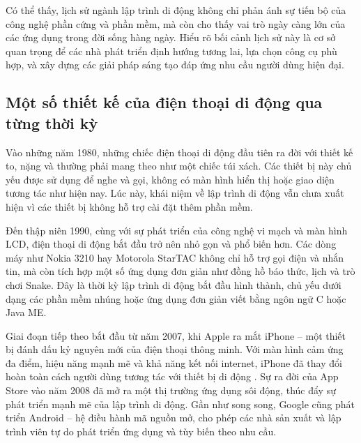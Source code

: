   \vspace{0.5em}

  \hspace*{0.8cm}Có thể thấy, lịch sử ngành lập trình di động không chỉ phản ánh sự tiến bộ của công nghệ phần cứng và phần mềm, mà còn cho thấy vai trò ngày càng lớn của các ứng dụng trong đời sống hàng ngày. Hiểu rõ bối cảnh lịch sử này là cơ sở quan trọng để các nhà phát triển định hướng tương lai, lựa chọn công cụ phù hợp, và xây dựng các giải pháp sáng tạo đáp ứng nhu cầu người dùng hiện đại.


\subsection{Một số thiết kế của điện thoại di động qua từng thời kỳ}
\renewcommand{\labelitemi}{--}    
    
        \hspace*{0.8cm}Vào những năm 1980, những chiếc điện thoại di động đầu tiên ra đời với thiết kế to, nặng và thường phải mang theo như một chiếc túi xách. Các thiết bị này chủ yếu được sử dụng để nghe và gọi, không có màn hình hiển thị hoặc giao diện tương tác như hiện nay. Lúc này, khái niệm về lập trình di động vẫn chưa xuất hiện vì các thiết bị không hỗ trợ cài đặt thêm phần mềm.
    
        \vspace{0.5em}
    
      \hspace*{0.8cm}Đến thập niên 1990, cùng với sự phát triển của công nghệ vi mạch và màn hình LCD, điện thoại di động bắt đầu trở nên nhỏ gọn và phổ biến hơn. Các dòng máy như Nokia 3210 hay Motorola StarTAC không chỉ hỗ trợ gọi điện và nhắn tin, mà còn tích hợp một số ứng dụng đơn giản như đồng hồ báo thức, lịch và trò chơi Snake. Đây là thời kỳ lập trình di động bắt đầu hình thành, chủ yếu dưới dạng các phần mềm nhúng hoặc ứng dụng đơn giản viết bằng ngôn ngữ C hoặc Java ME.
  
      \vspace{0.5em}
  
    \hspace*{0.8cm}Giai đoạn tiếp theo bắt đầu từ năm 2007, khi Apple ra mắt iPhone – một thiết bị đánh dấu kỷ nguyên mới của điện thoại thông minh. Với màn hình cảm ứng đa điểm, hiệu năng mạnh mẽ và khả năng kết nối internet, iPhone đã thay đổi hoàn toàn cách người dùng tương tác với thiết bị di động \cite{iphone2007}. Sự ra đời của App Store vào năm 2008 đã mở ra một thị trường ứng dụng sôi động, thúc đẩy sự phát triển mạnh mẽ của lập trình di động. Gần như song song, Google cũng phát triển Android – hệ điều hành mã nguồn mở, cho phép các nhà sản xuất và lập trình viên tự do phát triển ứng dụng và tùy biến theo nhu cầu.


